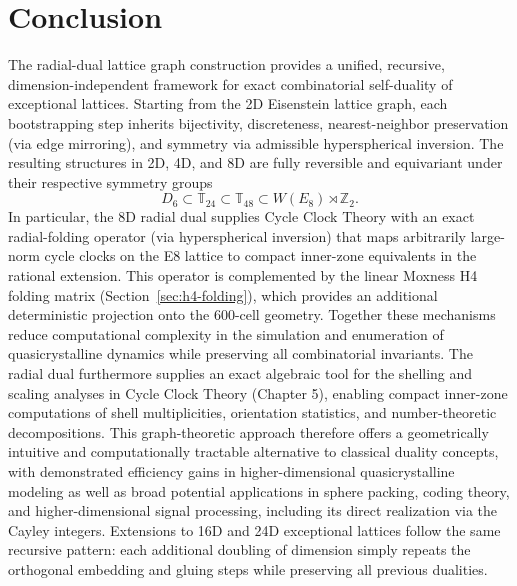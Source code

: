 \documentclass{article}
\begin{document}
\section{Conclusion}
The radial-dual lattice graph construction provides a unified, recursive, dimension-independent framework for exact combinatorial self-duality of exceptional lattices. Starting from the 2D Eisenstein lattice graph, each bootstrapping step inherits bijectivity, discreteness, nearest-neighbor preservation (via edge mirroring), and symmetry via admissible hyperspherical inversion. The resulting structures in 2D, 4D, and 8D are fully reversible and equivariant under their respective symmetry groups
\[
D_6 \subset \mathbb{T}_{24} \subset \mathbb{T}_{48} \subset W(E_8) \rtimes \mathbb{Z}_2.
\]
In particular, the 8D radial dual supplies Cycle Clock Theory with an exact radial-folding operator (via hyperspherical inversion) that maps arbitrarily large-norm cycle clocks on the E8 lattice to compact inner-zone equivalents in the rational extension. This operator is complemented by the linear Moxness H4 folding matrix (Section~\ref{sec:h4-folding}), which provides an additional deterministic projection onto the 600-cell geometry. Together these mechanisms reduce computational complexity in the simulation and enumeration of quasicrystalline dynamics while preserving all combinatorial invariants. The radial dual furthermore supplies an exact algebraic tool for the shelling and scaling analyses in Cycle Clock Theory (Chapter 5), enabling compact inner-zone computations of shell multiplicities, orientation statistics, and number-theoretic decompositions. This graph-theoretic approach therefore offers a geometrically intuitive and computationally tractable alternative to classical duality concepts, with demonstrated efficiency gains in higher-dimensional quasicrystalline modeling as well as broad potential applications in sphere packing, coding theory, and higher-dimensional signal processing, including its direct realization via the Cayley integers. Extensions to 16D and 24D exceptional lattices follow the same recursive pattern: each additional doubling of dimension simply repeats the orthogonal embedding and gluing steps while preserving all previous dualities.
\end{document}
